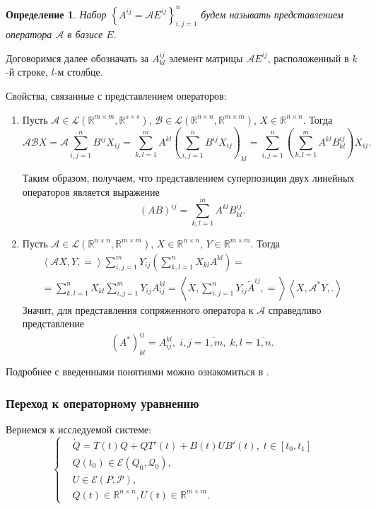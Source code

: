 \documentclass[12pt]{article}
\theoremstyle{rusdef}
\newtheorem{definition}{Определение}
\newcommand{\scalar}[2]{\left<#1,#2\right>}
\newcommand{\R}{\ensuremath{\mathbb{R}}} %
\newcommand{\E}{\ensuremath{\mathcal{E}}} %
\begin{document}
\begin{definition}
Набор $\left\{ A^{ij} = \mathcal{A} E^{ij} \right\}_{i,j=1}^{n}$ будем называть представлением оператора $\mathcal{A}$ в базисе $E$.
\end{definition}

Договоримся далее обозначать за $A^{ij}_{kl}$ элемент матрицы $\mathcal{A}E^{ij}$, расположенный в $k$-й строке, $l$-м столбце.

Свойства, связанные с представлением операторов:
\begin{enumerate}
\item Пусть $\mathcal{A} \in \mathscr{L}(\R^{m \times m},\R^{s \times s})$, $\mathcal{B} \in \mathscr{L}(\R^{n \times n},\R^{m \times m})$, $X \in \R^{n \times n}$. Тогда
$$
\mathcal{A}\mathcal{B}X = \mathcal{A} \sum\limits_{i,j=1}^{n} B^{ij} X_{ij} = \sum\limits_{k,l=1}^{m} A^{kl} \left(\sum\limits_{i,j=1}^{n} B^{ij} X_{ij} \right)_{kl} = \sum\limits_{i,j=1}^{n} \left(\sum\limits_{k,l=1}^{m} A^{kl} B^{ij}_{kl} \right) X_{ij}.
$$

Таким образом, получаем, что представлением суперпозиции двух линейных операторов является выражение
$$
(AB)^{ij} = \sum\limits_{k,l=1}^{m} A^{kl} B^{ij}_{kl}.
$$

\item Пусть $\mathcal{A} \in \mathscr{L}(\R^{n \times n},\R^{m \times m})$, $X \in \R^{n \times n}$, $Y \in \R^{m \times m}$. Тогда
\begin{multline*}
\scalar{ \mathcal{A}X, Y } = \sum\limits_{i,j=1}^{m} Y_{ij} \left( \sum\limits_{k,l=1}^{n} X_{kl} A^{kl} \right) = \\ = \sum\limits_{k,l = 1}^{n} X_{kl} \sum\limits_{i,j=1}^{m} Y_{ij} A_{ij}^{kl} = \scalar{X, \sum\limits_{i,j = 1}^{n} Y_{ij}\tilde{A}^{ij} } = \scalar{X, \mathcal{A}^* Y}.
\end{multline*}
Значит, для представления сопряженного оператора к $\mathcal{A}$ справедливо представление
$$
(A^*)^{ij}_{kl} = A^{kl}_{ij}, \; i,j=\overline{1,m}, \; k,l=\overline{1,n}.
$$
\end{enumerate}

Подробнее с введенными понятиями можно ознакомиться в \cite{month}.

\subsubsection*{Переход к операторному уравнению}
Вернемся к исследуемой системе:
$$
\left\{
\begin{aligned}
& \dot{Q} = T(t)Q + QT'(t) + B(t)UB'(t), \; t \in [t_0,t_1]\\
& Q(t_0) \in \E(Q_0,\mathcal{Q}_0),\\
& U \in \E(P,\mathcal{P}),\\
& Q(t) \in \R^{n \times n}, U(t) \in \R^{m \times m}.
\end{aligned}
\right.
$$
\end{document}

